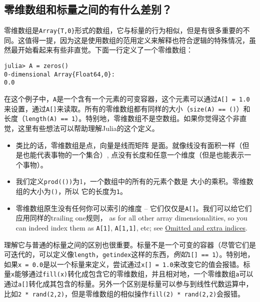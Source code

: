 \hypertarget{8539259979709593447}{}


\subsection{零维数组和标量之间的有什么差别？}



零维数组是\texttt{Array\{T,0\}}形式的数组，它与标量的行为相似，但是有很多重要的不同。这值得一提，因为这是使用数组的范用定义来解释也符合逻辑的特殊情况，虽然最开始看起来有些非直觉。下面一行定义了一个零维数组：




\begin{lstlisting}
julia> A = zeros()
0-dimensional Array{Float64,0}:
0.0
\end{lstlisting}



在这个例子中，\texttt{A}是一个含有一个元素的可变容器，这个元素可以通过\texttt{A[] = 1.0}来设置，通过\texttt{A[]}来读取。所有的零维数组都有同样的大小（\texttt{size(A) == ()}）和长度（\texttt{length(A) == 1}）。特别地，零维数组不是空数组。如果你觉得这个非直觉，这里有些想法可以帮助理解Julia的这个定义。



\begin{itemize}
\item 类比的话，零维数组是{\textquotedbl}点{\textquotedbl}，向量是{\textquotedbl}线{\textquotedbl}而矩阵 是{\textquotedbl}面{\textquotedbl}。就像线没有面积一样（但是也能代表事物的一个集合）, 点没有长度和任意一个维度（但是也能表示一个事物）。


\item 我们定义\texttt{prod(())}为1，一个数组中的所有的元素个数是 大小的乘积。零维数组的大小为\texttt{()}，所以 它的长度为\texttt{1}。


\item 零维数组原生没有任何你可以索引的维度 – 它们仅仅是\texttt{A[]}。我们可以给它们应用同样的{\textquotedbl}trailing one{\textquotedbl}规则， as for all other array dimensionalities, so you can indeed index them as \texttt{A[1]}, \texttt{A[1,1]}, etc; see \hyperlink{16741454967402507490}{Omitted and extra indices}.

\end{itemize}


理解它与普通的标量之间的区别也很重要。标量不是一个可变的容器（尽管它们是可迭代的，可以定义像\texttt{length}，\texttt{getindex}这样的东西，\emph{例如}\texttt{1[] == 1}）。特别地，如果\texttt{x = 0.0}是以一个标量来定义，尝试通过\texttt{x[] = 1.0}来改变它的值会报错。标量\texttt{x}能够通过\texttt{fill(x)}转化成包含它的零维数组，并且相对地，一个零维数组\texttt{a}可以通过\texttt{a[]}转化成其包含的标量。另外一个区别是标量可以参与到线性代数运算中，比如\texttt{2 * rand(2,2)}，但是零维数组的相似操作\texttt{fill(2) * rand(2,2)}会报错。



